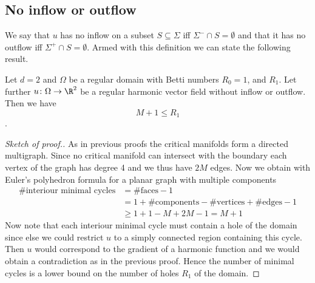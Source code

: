 \subsection{No inflow or outflow}

We say that $u$ has no inflow on a subset $S\subseteq\Sigma$ iff $\Sigma^-\cap S=\emptyset$ and that it has no outflow iff $\Sigma^+\cap S=\emptyset$.
Armed with this definition we can state the following result.
\begin{proposition}
  Let $d=2$ and $\Omega$ be a regular domain with Betti numbers $R_0=1$, and $R_1$. Let further $u\colon\Omega\to\R^2$ be 
  a regular harmonic vector field without inflow or outflow.
  Then we have $$M+1\leq R_1$$.
\end{proposition}
\begin{proof}[Sketch of proof.]
  As in previous proofs the critical manifolds form a directed multigraph. Since no critical manifold can intersect with the boundary each vertex
  of the graph has degree 4 and we thus have $2M$ edges. Now we obtain with Euler's polyhedron formula
  for a planar graph with multiple components
  \begin{align*}
    \text{\# interiour minimal cycles}
    &= \text{\#faces}-1 \\
    &= 1+\text{\#components}-\text{\#vertices}+\text{\#edges} -1 \\
    &\geq 1+1-M+2M -1 = M+1
  \end{align*}
  Now note that each interiour minimal cycle must contain a hole of the domain since else we could restrict $u$ to a simply
  connected region containing this cycle. Then $u$ would correspond to the gradient of 
  a harmonic function and we would obtain a contradiction as in the previous proof.
  Hence the number of minimal cycles is a lower bound on the number of holes $R_1$ of the domain.
\end{proof}

